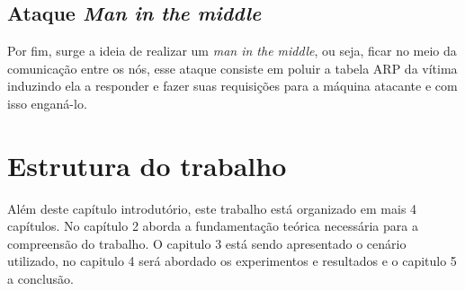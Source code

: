\subsection{Ataque \textit{Man in the middle}}
Por fim, surge a ideia de realizar um \textit{man in the middle}, ou seja, ficar no meio da comunicação entre os nós, esse ataque consiste em poluir a tabela ARP da vítima induzindo ela a responder e fazer suas requisições para a máquina atacante e com isso enganá-lo.

\section{Estrutura do trabalho}

Além deste capítulo introdutório, este trabalho está organizado em mais 4 capítulos. No capítulo 2 aborda a fundamentação teórica necessária para a compreensão do trabalho. O capitulo 3 está sendo apresentado o cenário utilizado, no capitulo 4 será abordado os experimentos e resultados e o capitulo 5 a conclusão. %
